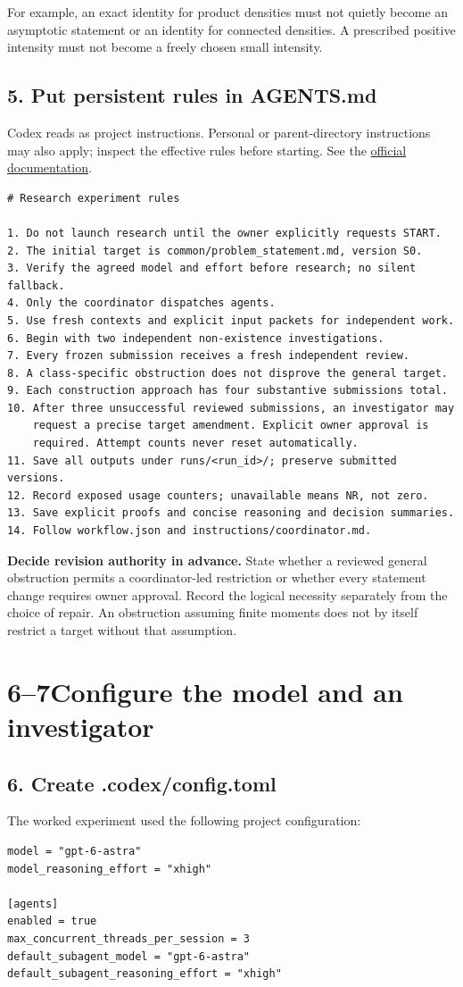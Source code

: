 \documentclass[11pt,a4paper]{article}
\newcommand{\pathcode}[1]{\texttt{\small\detokenize{#1}}}
\newcommand{\step}[2]{\section*{#1\quad #2}}
\begin{document}
For example, an exact identity for product densities must not quietly become an asymptotic statement or an identity for connected densities. A prescribed positive intensity must not become a freely chosen small intensity.

\subsection*{5. Put persistent rules in AGENTS.md}
Codex reads \pathcode{AGENTS.md} as project instructions. Personal or parent-directory instructions may also apply; inspect the effective rules before starting. See the \href{https://learn.chatgpt.com/docs/agent-configuration/agents-md}{official documentation}.
\begin{lstlisting}
# Research experiment rules

1. Do not launch research until the owner explicitly requests START.
2. The initial target is common/problem_statement.md, version S0.
3. Verify the agreed model and effort before research; no silent fallback.
4. Only the coordinator dispatches agents.
5. Use fresh contexts and explicit input packets for independent work.
6. Begin with two independent non-existence investigations.
7. Every frozen submission receives a fresh independent review.
8. A class-specific obstruction does not disprove the general target.
9. Each construction approach has four substantive submissions total.
10. After three unsuccessful reviewed submissions, an investigator may
    request a precise target amendment. Explicit owner approval is
    required. Attempt counts never reset automatically.
11. Save all outputs under runs/<run_id>/; preserve submitted versions.
12. Record exposed usage counters; unavailable means NR, not zero.
13. Save explicit proofs and concise reasoning and decision summaries.
14. Follow workflow.json and instructions/coordinator.md.
\end{lstlisting}

\textbf{Decide revision authority in advance.} State whether a reviewed general obstruction permits a coordinator-led restriction or whether every statement change requires owner approval. Record the logical necessity separately from the choice of repair. An obstruction assuming finite moments does not by itself restrict a target without that assumption.
\newpage

\step{6--7}{Configure the model and an investigator}
\subsection*{6. Create .codex/config.toml}
The worked experiment used the following project configuration:
\begin{lstlisting}
model = "gpt-6-astra"
model_reasoning_effort = "xhigh"

[agents]
enabled = true
max_concurrent_threads_per_session = 3
default_subagent_model = "gpt-6-astra"
default_subagent_reasoning_effort = "xhigh"
\end{lstlisting}
\end{document}

